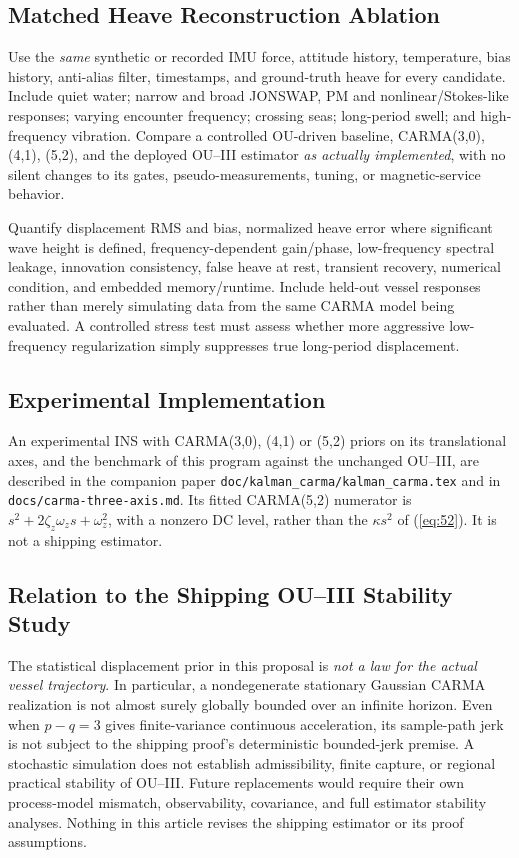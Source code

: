 \documentclass[10pt,journal]{IEEEtran}
\begin{document}
\subsection{Matched Heave Reconstruction Ablation}
Use the \emph{same} synthetic or recorded IMU force,
attitude history, temperature, bias history, anti-alias
filter, timestamps, and ground-truth heave for every
candidate. Include quiet water; narrow and broad JONSWAP,
PM and nonlinear/Stokes-like responses; varying encounter
frequency; crossing seas; long-period swell; and
high-frequency vibration. Compare a controlled OU-driven
baseline, CARMA(3,0), (4,1), (5,2), and the deployed
OU--III estimator \emph{as actually implemented}, with no
silent changes to its gates, pseudo-measurements, tuning,
or magnetic-service behavior.

Quantify displacement RMS and bias, normalized heave
error where significant wave height is defined,
frequency-dependent gain/phase, low-frequency spectral
leakage, innovation consistency, false heave at rest,
transient recovery, numerical condition, and embedded
memory/runtime. Include held-out vessel responses rather
than merely simulating data from the same CARMA model
being evaluated. A controlled stress test must assess
whether more aggressive low-frequency regularization
simply suppresses true long-period displacement.

\subsection{Experimental Implementation}
An experimental INS with CARMA(3,0), (4,1) or (5,2) priors on its
translational axes, and the benchmark of this program against the
unchanged OU--III, are described in the companion paper
\texttt{doc/kalman\_carma/kalman\_carma.tex} and in
\texttt{docs/carma-three-axis.md}. Its fitted CARMA(5,2) numerator is
\(s^2+2\zeta_z\omega_z s+\omega_z^2\), with a nonzero DC level, rather than
the \(\kappa s^2\) of (\ref{eq:52}). It is not a shipping estimator.

\subsection{Relation to the Shipping OU--III Stability Study}
The statistical displacement prior in this proposal is
\emph{not a law for the actual vessel trajectory}.
In particular, a nondegenerate stationary Gaussian
CARMA realization is not almost surely globally bounded
over an infinite horizon. Even when \(p-q=3\) gives
finite-variance continuous acceleration, its sample-path
jerk is not subject to the shipping proof's deterministic
bounded-jerk premise. A stochastic simulation does not
establish admissibility, finite capture, or regional
practical stability of OU--III. Future replacements would
require their own process-model mismatch, observability,
covariance, and full estimator stability analyses.
Nothing in this article revises the shipping estimator
or its proof assumptions.
\end{document}
